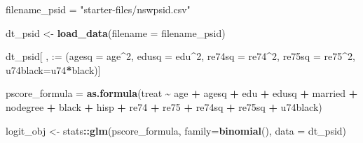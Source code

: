 \documentclass[
]{article}
\newenvironment{Shaded}{\begin{snugshade}}{\end{snugshade}}
\newcommand{\AttributeTok}[1]{\textcolor[rgb]{0.13,0.29,0.53}{#1}}
\newcommand{\DecValTok}[1]{\textcolor[rgb]{0.00,0.00,0.81}{#1}}
\newcommand{\FunctionTok}[1]{\textcolor[rgb]{0.13,0.29,0.53}{\textbf{#1}}}
\newcommand{\NormalTok}[1]{#1}
\newcommand{\OtherTok}[1]{\textcolor[rgb]{0.56,0.35,0.01}{#1}}
\newcommand{\SpecialCharTok}[1]{\textcolor[rgb]{0.81,0.36,0.00}{\textbf{#1}}}
\newcommand{\StringTok}[1]{\textcolor[rgb]{0.31,0.60,0.02}{#1}}
\begin{document}
\begin{Shaded}
\begin{Highlighting}[]
\NormalTok{filename\_psid }\OtherTok{=} \StringTok{"starter{-}files/nswpsid.csv"}

\NormalTok{dt\_psid }\OtherTok{\textless{}{-}} \FunctionTok{load\_data}\NormalTok{(}\AttributeTok{filename =}\NormalTok{ filename\_psid)}

\NormalTok{dt\_psid[ , }\StringTok{\textasciigrave{}}\AttributeTok{:=}\StringTok{\textasciigrave{}}\NormalTok{ (}\AttributeTok{agesq =}\NormalTok{ age}\SpecialCharTok{\^{}}\DecValTok{2}\NormalTok{, }\AttributeTok{edusq =}\NormalTok{ edu}\SpecialCharTok{\^{}}\DecValTok{2}\NormalTok{, }
                 \AttributeTok{re74sq =}\NormalTok{ re74}\SpecialCharTok{\^{}}\DecValTok{2}\NormalTok{, }\AttributeTok{re75sq =}\NormalTok{ re75}\SpecialCharTok{\^{}}\DecValTok{2}\NormalTok{, }\AttributeTok{u74black=}\NormalTok{u74}\SpecialCharTok{*}\NormalTok{black)]}

\NormalTok{pscore\_formula }\OtherTok{=} \FunctionTok{as.formula}\NormalTok{(treat }\SpecialCharTok{\textasciitilde{}}\NormalTok{ age }\SpecialCharTok{+}\NormalTok{ agesq }\SpecialCharTok{+}\NormalTok{ edu }\SpecialCharTok{+}\NormalTok{ edusq }\SpecialCharTok{+} 
\NormalTok{                              married }\SpecialCharTok{+}\NormalTok{ nodegree }\SpecialCharTok{+}\NormalTok{ black }\SpecialCharTok{+}\NormalTok{ hisp }\SpecialCharTok{+} 
\NormalTok{                              re74 }\SpecialCharTok{+}\NormalTok{ re75 }\SpecialCharTok{+}\NormalTok{ re74sq }\SpecialCharTok{+}\NormalTok{ re75sq }\SpecialCharTok{+}\NormalTok{ u74black)}
\end{Highlighting}
\end{Shaded}

\begin{Shaded}
\begin{Highlighting}[]
\NormalTok{logit\_obj }\OtherTok{\textless{}{-}}\NormalTok{ stats}\SpecialCharTok{::}\FunctionTok{glm}\NormalTok{(pscore\_formula, }\AttributeTok{family=}\FunctionTok{binomial}\NormalTok{(), }\AttributeTok{data =}\NormalTok{ dt\_psid)}
\end{Highlighting}
\end{Shaded}

\begin{Shaded}
\end{Shaded}
\end{document}
